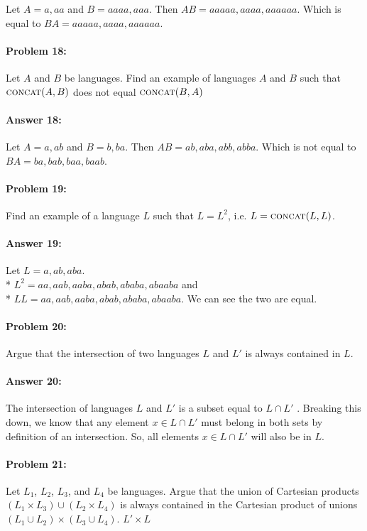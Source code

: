 \documentclass[10pt]{article}
\begin{document}
Let $A = {a, aa}$ and $B = {aaaa, aaa}$.
Then $AB = {aaaaa, aaaa, aaaaaa}$.
Which is equal to $BA = {aaaaa, aaaa, aaaaaa}$.

\hrulefill
\paragraph{Problem 18:}
Let $A$ and $B$ be languages. Find an example of languages $A$ and $B$
such that $\textsc{concat}(A,B)$ does not equal $\textsc{concat}(B,A)$

\paragraph{Answer 18:} 
Let $A = {a, ab}$ and $B = {b, ba}$.
Then $AB = {ab, aba, abb, abba}$.
Which is not equal to $BA = {ba, bab, baa, baab} $.

\hrulefill
\paragraph{Problem 19:}
Find an example of a language $L$ such that $L=L^2$,
i.e. $L=\textsc{concat}(L,L)$.

\paragraph{Answer 19:} 
Let $L = {a, ab, aba}$. \\* 
$ L^2 = {aa, aab, aaba, abab, ababa, abaaba}$ and \\*
$LL = {aa, aab, aaba, abab, ababa, abaaba}$. 
We can see the two are equal.

\hrulefill
\paragraph{Problem 20:}
Argue that the intersection of two languages $L$ and $L'$ is always
contained in $L$.

\paragraph{Answer 20:} 
The intersection of languages $L$ and $L'$ is a subset equal to $L \cap L'$ .
Breaking this down, we know that any element $x \in L \cap L'$ must belong in both sets by definition of an intersection.
So, all elements $x \in L \cap L'$ will also be in $L$.

\hrulefill
\paragraph{Problem 21:}
Let $L_1$, $L_2$, $L_3$, and $L_4$ be languages. Argue that the union
of Cartesian products $(L_1 \times L_3) \cup (L_2 \times L_4)$ is
always contained in the Cartesian product of unions
$(L_1 \cup L_2) \times (L_3 \cup L_4)$.
$L' \times L$
\end{document}

